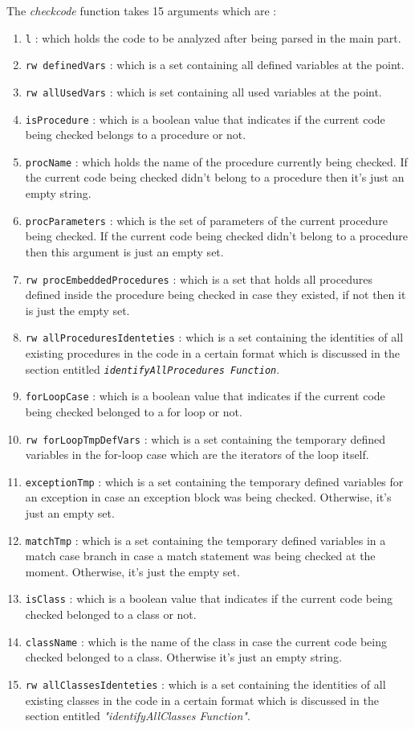 \documentclass[11pt]{report}
\begin{document}
The \textsl{checkcode} function takes 15 arguments which are :
\begin{enumerate}
\item \texttt{l} : which holds the code to be analyzed after being parsed in the main part.
\item \texttt{rw definedVars} : which is a set containing all defined variables at the point.
\item \texttt{rw allUsedVars} : which is set containing all used variables at the point.
\item \texttt{isProcedure} : which is a boolean value that indicates if the current code being checked belongs to a procedure or not.
\item \texttt{procName} : which holds the name of the procedure currently being checked. If the current code being checked didn't belong to a procedure then it's just an empty string. 
\item \texttt{procParameters} : which is the set of parameters of the current procedure being checked. If the current code being checked didn't belong to a procedure then this argument is just an empty set.
\item \texttt{rw procEmbeddedProcedures} : which is a set that holds all procedures defined inside the procedure being checked in case they existed, if not then it is just the empty set.
\item \texttt{rw allProceduresIdenteties} : which is a set containing the identities of all existing procedures in the code in a certain format which is discussed in the section entitled \texttt{\textsl{identifyAllProcedures Function}}.
\item \texttt{forLoopCase} : which is a boolean value that indicates if the current code being checked belonged to a for loop or not.
\item \texttt{rw forLoopTmpDefVars} : which is a set containing the temporary defined variables in the for-loop case which are the iterators of the loop itself.
\item \texttt{exceptionTmp} : which is a set containing the temporary defined variables for an exception in case an exception block was being checked. Otherwise, it's just an empty set.
\item \texttt{matchTmp} : which is a set containing the temporary defined variables in a match case branch in case a match statement was being checked at the moment. Otherwise, it's just the empty set.
\item \texttt{isClass} : which is a boolean value that indicates if the current code being checked belonged to a class or not.
\item \texttt{className} : which is the name of the class in case the current code being checked belonged to a class. Otherwise it's just an empty string.
\item \texttt{rw allClassesIdenteties} : which is a set containing the identities of all existing classes in the code in a certain format which is discussed in the section entitled \textsl{"identifyAllClasses Function"}.
\end{enumerate}
\end{document}
